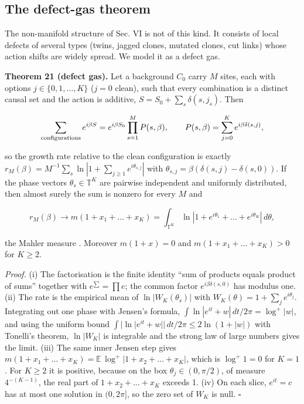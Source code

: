 \hypertarget{the-defect-gas-theorem}{%
\subsection{The defect-gas
theorem}\label{the-defect-gas-theorem}}

The non-manifold structure of Sec. VI is not of this kind.
It consists of local defects of several types (twins, jagged
clones, mutated clones, cut links) whose action shifts are
widely spread. We model it as a defect gas.

\textbf{Theorem 21 (defect gas).} Let a background \(C_0\)
carry \(M\) sites, each with options \(j\in\{0,1,\dots,K\}\)
(\(j=0\) clean), such that every combination is a distinct
causal set and the action is additive,
\(S=S_0+\sum_s\delta(s,j_s)\). Then

\[\sum_{\rm configurations}e^{i\beta S}=e^{i\beta S_0}\prod_{s=1}^MP(s,\beta),\qquad P(s,\beta)=\sum_{j=0}^Ke^{i\beta\delta(s,j)},\]

so the growth rate relative to the clean configuration is
exactly
\(r_M(\beta)=M^{-1}\sum_s\ln\left|1+\sum_{j\ge1}e^{i\theta_{s,j}}\right|\)
with \(\theta_{s,j}=\beta(\delta(s,j)-\delta(s,0))\). If the
phase vectors \(\theta_s\in\mathbb T^K\) are pairwise
independent and uniformly distributed, then almost surely
the sum is nonzero for every \(M\) and

\[r_M(\beta)\longrightarrow m(1+x_1+\dots+x_K)=\int_{\mathbb T^K}\ln\left|1+e^{i\theta_1}+\dots+e^{i\theta_K}\right|\,d\theta ,\]

the Mahler measure \cite{Mahler62}. Moreover \(m(1+x)=0\)
and \(m(1+x_1+\dots+x_K)>0\) for \(K\ge2\).

\emph{Proof.} (i) The factorisation is the finite identity
``sum of products equals product of sums'' together with
\(e^{\sum}=\prod e\); the common factor
\(e^{i\beta\delta(s,0)}\) has modulus one. (ii) The rate is
the empirical mean of \(\ln|W_K(\theta_s)|\) with
\(W_K(\theta)=1+\sum_je^{i\theta_j}\). Integrating out one
phase with Jensen's formula,
\(\int\ln|e^{it}+w|\,dt/2\pi=\log^+|w|\), and using the
uniform bound \(\int|\ln|e^{it}+w||\,dt/2\pi\le2\ln(1+|w|)\)
with Tonelli's theorem, \(\ln|W_K|\) is integrable and the
strong law of large numbers gives the limit. (iii) The same
inner Jensen step gives
\(m(1+x_1+\dots+x_K)=\mathbb E\,\log^+|1+x_2+\dots+x_K|\),
which is \(\log^+1=0\) for \(K=1\). For \(K\ge2\) it is
positive, because on the box \(\theta_j\in(0,\pi/2)\), of
measure \(4^{-(K-1)}\), the real part of \(1+x_2+\dots+x_K\)
exceeds 1. (iv) On each slice, \(e^{it}=c\) has at most one
solution in \((0,2\pi]\), so the zero set of \(W_K\) is
null. \(\square\)

